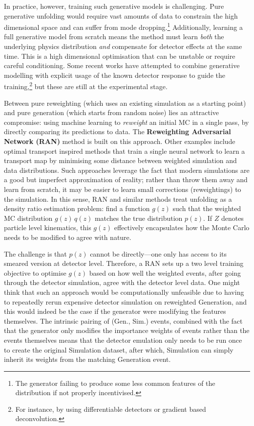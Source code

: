 {{        In practice, however, training such generative models is challenging.
        Pure generative unfolding would require vast amounts of data to constrain the high dimensional space and can suffer from mode dropping.\footnote{The generator failing to produce some less common features of the distribution if not properly incentivised.}
        Additionally, learning a full generative model from scratch means the method must learn \emph{both} the underlying physics distribution \emph{and} compensate for detector effects at the same time.
        This is a high dimensional optimisation that can be unstable or require careful conditioning.
        Some recent works have attempted to combine generative modelling with explicit usage of the known detector response to guide the training,\footnote{For instance, by using differentiable detectors or gradient based deconvolution.} but these are still at the experimental stage.

        Between pure reweighting (which uses an existing simulation as a starting point) and pure generation (which starts from random noise) lies an attractive compromise: using machine learning to \emph{reweight} an initial MC in a single pass, by directly comparing its predictions to data.
        The \textbf{Reweighting Adversarial Network (RAN)} method is built on this approach.
        Other examples include optimal transport inspired methods that train a single neural network to learn a transport map by minimising some distance between weighted simulation and data distributions.
        Such approaches leverage the fact that modern simulations are a good but imperfect approximation of reality; rather than throw them away and learn from scratch, it may be easier to learn small corrections (reweightings) to the simulation.
        In this sense, RAN and similar methods treat unfolding as a density ratio estimation problem: find a function $g(z)$ such that the weighted MC distribution $g(z)\,q(z)$ matches the true distribution $p(z)$.
        If $Z$ denotes particle level kinematics, this $g(z)$ effectively encapsulates how the Monte Carlo needs to be modified to agree with nature.
        
        The challenge is that $p(z)$ cannot be directly---one only has access to its smeared version at detector level.
        Therefore, a RAN sets up a two level training objective to optimise $g(z)$ based on how well the weighted events, after going through the detector simulation, agree with the detector level data.
        One might think that such an approach would be computationally unfeasible due to having to repeatedly rerun expensive detector simulation on reweighted Generation, and this would indeed be the case if the generator were modifying the features themselves.
        The intrinsic pairing of (Gen., Sim.) events, combined with the fact that the generator only modifies the importance weights of events rather than the events themselves means that the detector emulation only needs to be run once to create the original Simulation dataset, after which, Simulation can simply inherit its weights from the matching Generation event.

}}
